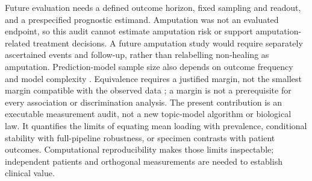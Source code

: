 \documentclass[10pt,a4paper]{article}
\begin{document}
Future evaluation needs a defined outcome horizon, fixed sampling and readout, and a prespecified prognostic estimand. Amputation was not an evaluated endpoint, so this audit cannot estimate amputation risk or support amputation-related treatment decisions. A future amputation study would require separately ascertained events and follow-up, rather than relabelling non-healing as amputation. Prediction-model sample size also depends on outcome frequency and model complexity \citep{riley2019}. Equivalence requires a justified margin, not the smallest margin compatible with the observed data \citep{lakens2017}; a margin is not a prerequisite for every association or discrimination analysis. The present contribution is an executable measurement audit, not a new topic-model algorithm or biological law. It quantifies the limits of equating mean loading with prevalence, conditional stability with full-pipeline robustness, or specimen contrasts with patient outcomes. Computational reproducibility makes those limits inspectable; independent patients and orthogonal measurements are needed to establish clinical value.
\end{document}
